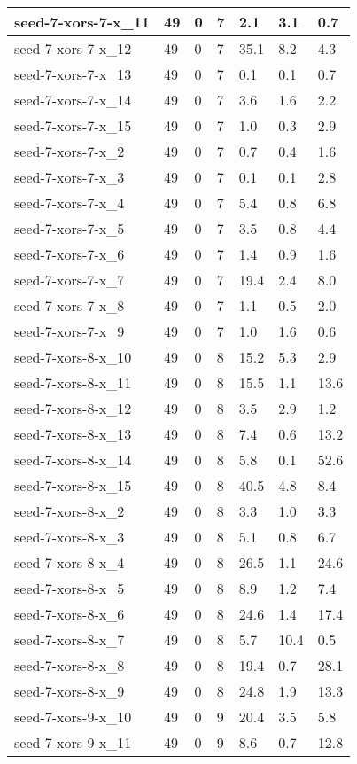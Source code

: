 \begin{scriptsize}
\begin{longtable}{|p{5cm}|l|l|l|l|l|l|}
seed-7-xors-7-x\_11&49&0&7&2.1&3.1&0.7 \\ \hline 
seed-7-xors-7-x\_12&49&0&7&35.1&8.2&4.3 \\ \hline 
seed-7-xors-7-x\_13&49&0&7&0.1&0.1&0.7 \\ \hline 
seed-7-xors-7-x\_14&49&0&7&3.6&1.6&2.2 \\ \hline 
seed-7-xors-7-x\_15&49&0&7&1.0&0.3&2.9 \\ \hline 
seed-7-xors-7-x\_2&49&0&7&0.7&0.4&1.6 \\ \hline 
seed-7-xors-7-x\_3&49&0&7&0.1&0.1&2.8 \\ \hline 
seed-7-xors-7-x\_4&49&0&7&5.4&0.8&6.8 \\ \hline 
seed-7-xors-7-x\_5&49&0&7&3.5&0.8&4.4 \\ \hline 
seed-7-xors-7-x\_6&49&0&7&1.4&0.9&1.6 \\ \hline 
seed-7-xors-7-x\_7&49&0&7&19.4&2.4&8.0 \\ \hline 
seed-7-xors-7-x\_8&49&0&7&1.1&0.5&2.0 \\ \hline 
seed-7-xors-7-x\_9&49&0&7&1.0&1.6&0.6 \\ \hline 
seed-7-xors-8-x\_10&49&0&8&15.2&5.3&2.9 \\ \hline 
seed-7-xors-8-x\_11&49&0&8&15.5&1.1&13.6 \\ \hline 
seed-7-xors-8-x\_12&49&0&8&3.5&2.9&1.2 \\ \hline 
seed-7-xors-8-x\_13&49&0&8&7.4&0.6&13.2 \\ \hline 
seed-7-xors-8-x\_14&49&0&8&5.8&0.1&52.6 \\ \hline 
seed-7-xors-8-x\_15&49&0&8&40.5&4.8&8.4 \\ \hline 
seed-7-xors-8-x\_2&49&0&8&3.3&1.0&3.3 \\ \hline 
seed-7-xors-8-x\_3&49&0&8&5.1&0.8&6.7 \\ \hline 
seed-7-xors-8-x\_4&49&0&8&26.5&1.1&24.6 \\ \hline 
seed-7-xors-8-x\_5&49&0&8&8.9&1.2&7.4 \\ \hline 
seed-7-xors-8-x\_6&49&0&8&24.6&1.4&17.4 \\ \hline 
seed-7-xors-8-x\_7&49&0&8&5.7&10.4&0.5 \\ \hline 
seed-7-xors-8-x\_8&49&0&8&19.4&0.7&28.1 \\ \hline 
seed-7-xors-8-x\_9&49&0&8&24.8&1.9&13.3 \\ \hline 
seed-7-xors-9-x\_10&49&0&9&20.4&3.5&5.8 \\ \hline 
seed-7-xors-9-x\_11&49&0&9&8.6&0.7&12.8 \\ \hline 

\end{longtable}
\end{scriptsize}

